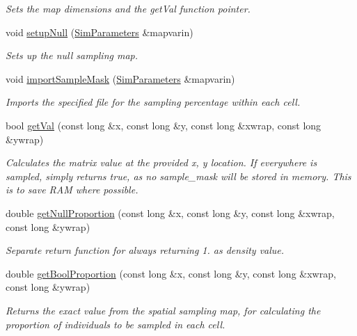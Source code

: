 \begin{DoxyCompactItemize}
\begin{DoxyCompactList}\small\item\em Sets the map dimensions and the get\+Val function pointer. \end{DoxyCompactList}\item 
void \hyperlink{class_data_mask_a8a1071a51c4114cda3f73eeb98992fb4}{setup\+Null} (\hyperlink{struct_sim_parameters}{Sim\+Parameters} \&mapvarin)\hypertarget{class_data_mask_a8a1071a51c4114cda3f73eeb98992fb4}{}\label{class_data_mask_a8a1071a51c4114cda3f73eeb98992fb4}

\begin{DoxyCompactList}\small\item\em Sets up the null sampling map. \end{DoxyCompactList}\item 
void \hyperlink{class_data_mask_ac756e21b1c8d9412d565fb020eec9a06}{import\+Sample\+Mask} (\hyperlink{struct_sim_parameters}{Sim\+Parameters} \&mapvarin)
\begin{DoxyCompactList}\small\item\em Imports the specified file for the sampling percentage within each cell. \end{DoxyCompactList}\item 
bool \hyperlink{class_data_mask_ace6578db5b096b0c24112cc438cfa90d}{get\+Val} (const long \&x, const long \&y, const long \&xwrap, const long \&ywrap)
\begin{DoxyCompactList}\small\item\em Calculates the matrix value at the provided x, y location. If everywhere is sampled, simply returns true, as no sample\+\_\+mask will be stored in memory. This is to save R\+AM where possible. \end{DoxyCompactList}\item 
double \hyperlink{class_data_mask_af7a7cb35d309d37f42c7a3720a02b400}{get\+Null\+Proportion} (const long \&x, const long \&y, const long \&xwrap, const long \&ywrap)
\begin{DoxyCompactList}\small\item\em Separate return function for always returning 1. as density value. \end{DoxyCompactList}\item 
double \hyperlink{class_data_mask_a31cb42c363219967a7867340a7110e9f}{get\+Bool\+Proportion} (const long \&x, const long \&y, const long \&xwrap, const long \&ywrap)
\begin{DoxyCompactList}\small\item\em Returns the exact value from the spatial sampling map, for calculating the proportion of individuals to be sampled in each cell. \end{DoxyCompactList}\item 

\end{DoxyCompactItemize}
